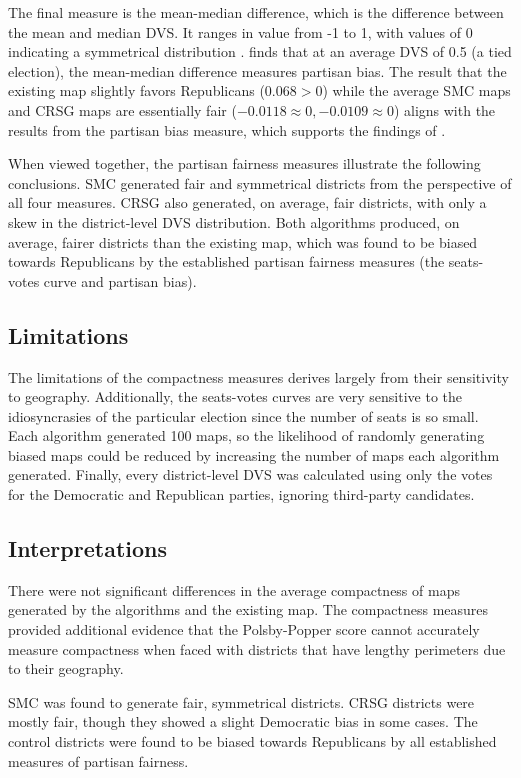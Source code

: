 The final measure is the mean-median difference, which is the difference between the mean and median DVS. It ranges in value from -1 to 1, with values of 0 indicating a symmetrical distribution \parencite{mcdonald2015}. \textcite{katz2020} finds that at an average DVS of 0.5 (a tied election), the mean-median difference measures partisan bias. The result that the existing map slightly favors Republicans ($0.068 > 0$) while the average SMC maps and CRSG maps are essentially fair ($-0.0118 \approx 0, -0.0109 \approx 0$) aligns with the results from the partisan bias measure, which supports the findings of \textcite{katz2020}. 

When viewed together, the partisan fairness measures illustrate the following conclusions. SMC generated fair and symmetrical districts from the perspective of all four measures. CRSG also generated, on average, fair districts, with only a skew in the district-level DVS distribution. Both algorithms produced, on average, fairer districts than the existing map, which was found to be biased towards Republicans by the established partisan fairness measures (the seats-votes curve and partisan bias). 

\subsection{Limitations}

The limitations of the compactness measures derives largely from their sensitivity to geography. Additionally, the seats-votes curves are very sensitive to the idiosyncrasies of the particular election since the number of seats is so small. Each algorithm generated 100 maps, so the likelihood of randomly generating biased maps could be reduced by increasing the number of maps each algorithm generated. Finally, every district-level DVS was calculated using only the votes for the Democratic and Republican parties, ignoring third-party candidates.

\subsection{Interpretations}

There were not significant differences in the average compactness of maps generated by the algorithms and the existing map. The compactness measures provided additional evidence that the Polsby-Popper score cannot accurately measure compactness when faced with districts that have lengthy perimeters due to their geography. 

SMC was found to generate fair, symmetrical districts. CRSG districts were mostly fair, though they showed a slight Democratic bias in some cases. The control districts were found to be biased towards Republicans by all established measures of partisan fairness. 